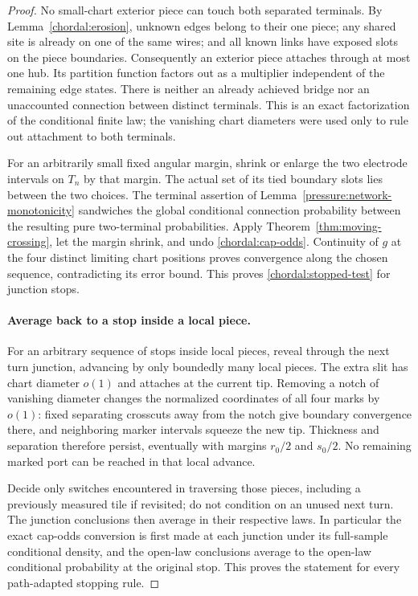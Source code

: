 \begin{proof}
No small-chart exterior piece can touch both separated terminals.
By Lemma~\ref{chordal:erosion}, unknown edges belong to their one
piece; any shared site is already on one of the same wires; and
all known links have exposed slots on the piece boundaries.
Consequently an exterior piece attaches through at most one hub.
Its partition function factors out as a multiplier independent of
the remaining edge states.  There is neither an already achieved
bridge nor an unaccounted connection between distinct terminals.
This is an exact factorization of the conditional finite law; the
vanishing chart diameters were used only to rule out attachment to
both terminals.

For an arbitrarily small fixed angular margin, shrink or enlarge
the two electrode intervals on $T_n$ by that margin.  The actual
set of its tied boundary slots lies between the two choices.
The terminal assertion of Lemma~\ref{pressure:network-monotonicity}
sandwiches the global conditional connection
probability between the resulting pure two-terminal probabilities.
Apply Theorem~\ref{thm:moving-crossing}, let the margin shrink, and
undo \eqref{chordal:cap-odds}.  Continuity of $g$ at the four
distinct limiting chart positions proves convergence along the
chosen sequence, contradicting its error bound.  This proves
\eqref{chordal:stopped-test} for junction stops.

\paragraph{Average back to a stop inside a local piece.}
For an arbitrary sequence of stops inside local pieces, reveal
through the next turn
junction, advancing by only boundedly many local pieces.  The
extra slit has chart diameter $o(1)$ and attaches at the current
tip.  Removing a notch of vanishing diameter changes the normalized
coordinates of all four marks by $o(1)$: fixed separating crosscuts
away from the notch give boundary convergence there, and neighboring
marker intervals squeeze the new tip.  Thickness and separation
therefore persist, eventually with margins $r_0/2$ and $s_0/2$.
No remaining marked port can be reached in that local advance.

Decide only switches encountered in traversing those pieces,
including a previously measured tile if revisited; do not condition
on an unused next turn.  The junction conclusions then average in
their respective laws.  In particular the exact cap-odds conversion
is first made at each junction under its full-sample conditional
density, and the open-law conclusions average to the open-law
conditional probability at the original stop.  This proves the
statement for every path-adapted stopping rule.
\end{proof}

